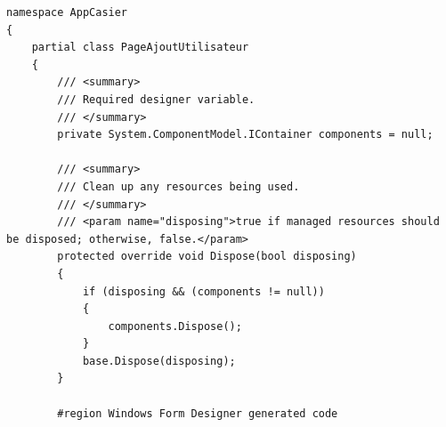 \documentclass[main.tex]{subfiles}
\begin{document}
\begin{lstlisting}
namespace AppCasier
{
    partial class PageAjoutUtilisateur
    {
        /// <summary>
        /// Required designer variable.
        /// </summary>
        private System.ComponentModel.IContainer components = null;

        /// <summary>
        /// Clean up any resources being used.
        /// </summary>
        /// <param name="disposing">true if managed resources should be disposed; otherwise, false.</param>
        protected override void Dispose(bool disposing)
        {
            if (disposing && (components != null))
            {
                components.Dispose();
            }
            base.Dispose(disposing);
        }

        #region Windows Form Designer generated code


\end{lstlisting}
\end{document}

